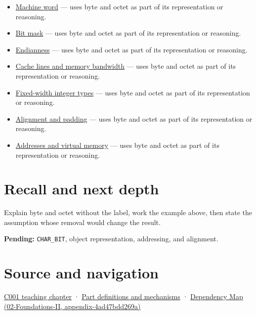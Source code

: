 \begin{itemize}
\tightlist
\item
  \hyperref[appendix-d67a19507dc5]{Machine word} --- uses byte and octet as part of its representation or reasoning.
\item
  \hyperref[appendix-dbe5905163c2]{Bit mask} --- uses byte and octet as part of its representation or reasoning.
\item
  \hyperref[appendix-bc07c3d25b18]{Endianness} --- uses byte and octet as part of its representation or reasoning.
\item
  \hyperref[appendix-e4ccdbab8320]{Cache lines and memory bandwidth} --- uses byte and octet as part of its representation or reasoning.
\item
  \hyperref[appendix-cc04044b5782]{Fixed-width integer types} --- uses byte and octet as part of its representation or reasoning.
\item
  \hyperref[appendix-a1f7c53b4742]{Alignment and padding} --- uses byte and octet as part of its representation or reasoning.
\item
  \hyperref[appendix-18ee4f913c3c]{Addresses and virtual memory} --- uses byte and octet as part of its representation or reasoning.
\end{itemize}

\section{Recall and next depth}\label{appendix-5bee2df85484-recall-and-next-depth}

Explain byte and octet without the label, work the example above, then state the assumption whose removal would change the result.

\textbf{Pending:} \texttt{CHAR\_BIT}, object representation, addressing, and alignment.

\section{Source and navigation}\label{appendix-5bee2df85484-source-and-navigation}

\href{Continuous\%20Notes/Computing\%20Foundations\%20-\%20From\%20Bits\%20to\%20C++\%20and\%20Systems\%20APIs\#From\%20a\%20signal\%20to\%20an\%20interpretation}{C001 teaching chapter} · \hyperref[appendix-fd090d982a15]{Part definitions and mechanisms} · \href{../02-Foundations-II/main.pdf\#nameddest=appendix-4ad47bdd269a}{Dependency Map (02-Foundations-II, appendix-4ad47bdd269a)}

